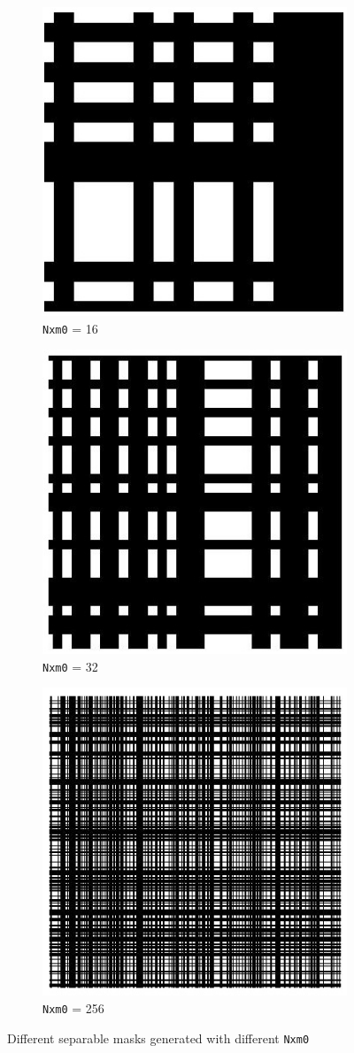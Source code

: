   \begin{figure}[ht]
    \centering
    \begin{subfigure}{0.5\textwidth}
    \centering
        \includegraphics[width=0.5\linewidth]{pics/mask_16}
        \caption{\texttt{Nxm0} = 16}
        \label{fig:mask-16}
    \end{subfigure}%
    \begin{subfigure}{0.5\textwidth}
    \centering
        \includegraphics[width=0.5\linewidth]{pics/mask_32}
        \caption{\texttt{Nxm0} = 32}
        \label{fig:mask-32}
    \end{subfigure}
    
    \begin{subfigure}{0.5\textwidth}
    \centering
        \includegraphics[width=0.5\linewidth]{pics/mask_256}
        \caption{\texttt{Nxm0} = 256}
        \label{fig:mask-256}
    \end{subfigure}%
    \caption{Different separable masks generated with different \texttt{Nxm0}}
    \label{fig:sep_mask_multi}
    \end{figure}

